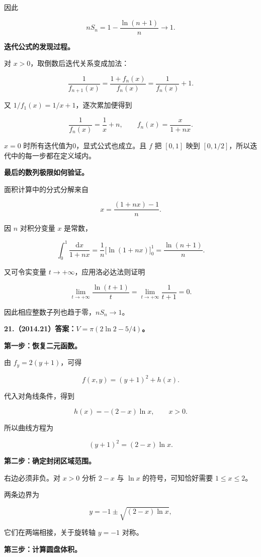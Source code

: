 \documentclass[UTF8,11pt,fontset=windows]{ctexart}
\begin{document}
因此

$$
nS_n=1-\frac{\ln(n+1)}n\longrightarrow1.
$$

\textbf{迭代公式的发现过程。}

对 $x>0$，取倒数后迭代关系变成加法：

$$
\frac1{f_{n+1}(x)}
=\frac{1+f_n(x)}{f_n(x)}
=\frac1{f_n(x)}+1.
$$

又 $1/f_1(x)=1/x+1$，逐次累加便得到

$$
\frac1{f_n(x)}=\frac1x+n,
\qquad f_n(x)=\frac{x}{1+nx}.
$$

$x=0$ 时所有迭代值为0，显式公式也成立。且 $f$ 把 $[0,1]$ 映到 $[0,1/2]$，所以迭代中的每一步都在定义域内。

\textbf{最后的数列极限如何验证。}

面积计算中的分式分解来自

$$
x=\frac{(1+nx)-1}{n}.
$$

因 $n$ 对积分变量 $x$ 是常数，

$$
\int_0^1\frac{\mathrm dx}{1+nx}
=\frac1n\bigl[\ln(1+nx)\bigr]_0^1
=\frac{\ln(n+1)}n.
$$

又可令实变量 $t\to+\infty$，应用洛必达法则证明

$$
\lim_{t\to+\infty}\frac{\ln(t+1)}t
=\lim_{t\to+\infty}\frac1{t+1}=0.
$$

因此相应整数子列也趋于零，$nS_n\to1$。

\clearpage

\textbf{21.（2014.21）答案：$V=\pi(2\ln2-5/4)$。}

\textbf{第一步：恢复二元函数。}

由 $f_y=2(y+1)$，可得

$$
f(x,y)=(y+1)^2+h(x).
$$

代入对角线条件，得到

$$
h(x)=-(2-x)\ln x,\qquad x>0.
$$

所以曲线方程为

$$
(y+1)^2=(2-x)\ln x.
$$

\textbf{第二步：确定封闭区域范围。}

右边必须非负。对 $x>0$ 分析 $2-x$ 与 $\ln x$ 的符号，可知恰好需要 $1\le x\le2$。

两条边界为

$$
y=-1\pm\sqrt{(2-x)\ln x},
$$

它们在两端相接，关于旋转轴 $y=-1$ 对称。

\textbf{第三步：计算圆盘体积。}
\end{document}
